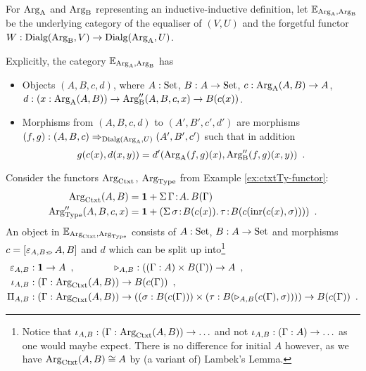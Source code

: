 \documentclass[orivec,envcountsame, ,envcountsect]{llncs}
\begin{document}

\begin{definition}
  For $\text{Arg}_{\text{A}}$ and $\text{Arg}_{\text{B}}$ representing an inductive-inductive
  definition, let $\mathbb{E}_{\text{Arg}_{\text{A}}, \text{Arg}_{\text{B}}}$ be the underlying category of
  the equaliser of $(V, U)$ and the forgetful functor ${W :
    \text{Dialg}(\text{Arg}_{\text{B}}, V) \to \text{Dialg}(\text{Arg}_{\text{A}}, U)}$.
\end{definition}
Explicitly, the category $\mathbb{E}_{\text{Arg}_{\text{A}}, \text{Arg}_{\text{B}}}$ has
\begin{itemize}
\item Objects $(A, B, c, d)$, where $A : \text{Set}$, $B : A \to \text{Set}$, $c : \text{Arg}_{\text{A}}(A, B) \to A$, $d : (x : \text{Arg}_{\text{A}}(A, B)) \to \text{Arg}_{\text{B}}''(A, B, c, x) \to B(c(x))$.
\item Morphisms from $(A, B, c, d)$ to $(A', B', c', d')$ are morphisms \\ $(f, g) :
  (A, B, c) \Rightarrow_{\text{Dialg}(\text{Arg}_{\text{A}}, U)} (A', B', c')$ such that in addition
  \[
  g(c(x), d(x, y)) = d'(\text{Arg}_{\text{A}}(f,g)(x), \text{Arg}_{\text{B}}''(f,g)(x, y)) \enspace .
  \]
\end{itemize}


\begin{example}
  Consider the functors $\text{Arg}_{\text{Ctxt}}$, $\text{Arg}_{\text{Type}}$ from Example \ref{ex:ctxtTy-functor}:
\begin{align*}
  \text{Arg}_{\text{Ctxt}}(A, B) &= \mathbf{1} + \Sigma\, \Gamma\!:\!A .\, B(\Gamma)\\
  \text{Arg}_{\text{Type}}''(A, B, c, x) &= \mathbf{1} + (\Sigma\,  \sigma\!:\! B(c(x)).\, \tau\!:\!B(c(\text{inr}(c(x), \sigma))) ) \enspace .
\end{align*}
An object in $\mathbb{E}_{\text{Arg}_{\text{Ctxt}}, \text{Arg}_{\text{Type}}}$ consists of $A : \text{Set}$, $B :
A \to \text{Set}$ and morphisms $c =
[\varepsilon_{A,B}, _ {\triangleright} A,B]$ and $d$ which can be
split up into\footnote{Notice that $\iota_{A,B} : (\Gamma :
  \text{Arg}_{\text{Ctxt}}(A, B)) \to \ldots$ and not $\iota_{A,B} : (\Gamma :
  A) \to \ldots$ as one would maybe expect. There is no difference for
  initial $A$ however, as we have $\text{Arg}_{\text{Ctxt}}(A, B) \cong A$ by (a
  variant of) Lambek's Lemma.}
\begin{align*}
  \emptyCtxt_{A,B} &: \one \to A \enspace , \qquad\qquad \consCtxtbare_{A,B} : ((\Gamma : A) \times B(\Gamma)) \to A  \enspace , \\
\baseTybare_{A,B} &: (\Gamma : \ArgCtxt(A, B)) \to B(c(\Gamma)) \enspace , \\
\piTybare_{A,B} &: (\Gamma : \ArgCtxt(A, B)) \to ((\sigma : B(c(\Gamma))) \times (\tau : B(\consCtxtbare_{A,B}(c(\Gamma), \sigma)))) \to B(c(\Gamma)) \enspace. %
\end{align*}
\end{example}
\end{document}
